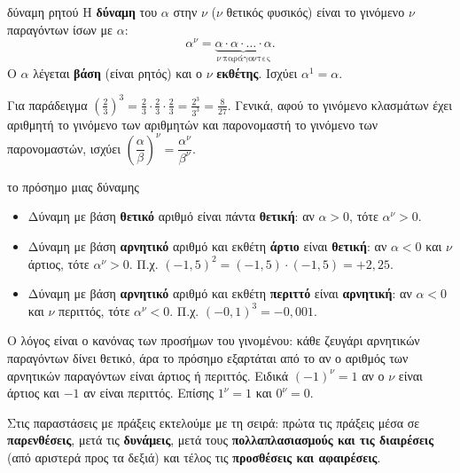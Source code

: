
\begin{orismos}{δύναμη ρητού}
Η \textbf{δύναμη} του $\alpha$ στην $\nu$ ($\nu$ θετικός φυσικός) είναι το γινόμενο $\nu$ παραγόντων ίσων με $\alpha$:
$$\alpha^{\nu}=\underbrace{\alpha\cdot\alpha\cdot\ldots\cdot\alpha}_{\nu\ \text{παράγοντες}}.$$
Ο $\alpha$ λέγεται \textbf{βάση} (είναι ρητός) και ο $\nu$ \textbf{εκθέτης}. Ισχύει $\alpha^1=\alpha$.
\end{orismos}

Για παράδειγμα $\left(\frac{2}{3}\right)^3=\frac{2}{3}\cdot\frac{2}{3}\cdot\frac{2}{3}=\frac{2^3}{3^3}=\frac{8}{27}$. Γενικά, αφού το γινόμενο κλασμάτων έχει αριθμητή το γινόμενο των αριθμητών και παρονομαστή το γινόμενο των παρονομαστών, ισχύει $\left(\dfrac{\alpha}{\beta}\right)^{\nu}=\dfrac{\alpha^{\nu}}{\beta^{\nu}}$.

\begin{kanonas}{το πρόσημο μιας δύναμης}
\begin{itemize}[leftmargin=1.2em,itemsep=0.3ex,topsep=2pt]
\item Δύναμη με βάση \textbf{θετικό} αριθμό είναι πάντα \textbf{θετική}: αν $\alpha>0$, τότε $\alpha^{\nu}>0$.
\item Δύναμη με βάση \textbf{αρνητικό} αριθμό και εκθέτη \textbf{άρτιο} είναι \textbf{θετική}: αν $\alpha<0$ και $\nu$ άρτιος, τότε $\alpha^{\nu}>0$. Π.χ. $(-1{,}5)^2=(-1{,}5)\cdot(-1{,}5)=+2{,}25$.
\item Δύναμη με βάση \textbf{αρνητικό} αριθμό και εκθέτη \textbf{περιττό} είναι \textbf{αρνητική}: αν $\alpha<0$ και $\nu$ περιττός, τότε $\alpha^{\nu}<0$. Π.χ. $(-0{,}1)^3=-0{,}001$.
\end{itemize}
\end{kanonas}

Ο λόγος είναι ο κανόνας των προσήμων του γινομένου: κάθε ζευγάρι αρνητικών παραγόντων δίνει θετικό, άρα το πρόσημο εξαρτάται από το αν ο αριθμός των αρνητικών παραγόντων είναι άρτιος ή περιττός. Ειδικά $(-1)^{\nu}=1$ αν ο $\nu$ είναι άρτιος και $-1$ αν είναι περιττός. Επίσης $1^{\nu}=1$ και $0^{\nu}=0$.


Στις παραστάσεις με πράξεις εκτελούμε με τη σειρά: πρώτα τις πράξεις μέσα σε \textbf{παρενθέσεις}, μετά τις \textbf{δυνάμεις}, μετά τους \textbf{πολλαπλασιασμούς και τις διαιρέσεις} (από αριστερά προς τα δεξιά) και τέλος τις \textbf{προσθέσεις και αφαιρέσεις}.

